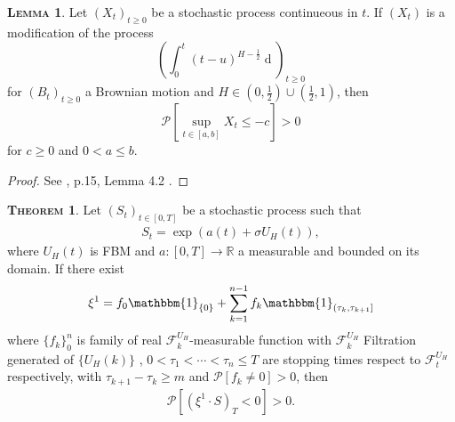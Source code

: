 \documentclass[a4paper, twoside, 11pt]{article}
\theoremstyle{definition}
\newtheorem{theorem}[definition]{\scshape Theorem}
\newtheorem{lemma}[definition]{\scshape Lemma}
\newcommand{\brkt}[1]{\left({#1} \right)}
\begin{document}
\begin{lemma}
  Let $(X_t)_{t\ge 0}$ be a stochastic process continueous in $t$. If $(X_t)$ is a modification of the process 
  $$
  \brkt{\int_0^t (t-u)^{H-\frac{1}{2}}\mathop{dB_u}}_{t\ge 0}
  $$
  for $(B_t)_{t\ge 0}$ a Brownian motion and $H\in (0, \frac{1}{2})\cup(\frac{1}{2}, 1)$,
  then 
  $$
  \mathcal{P}[\sup\limits_{t\in[a,b]} X_t \le -c] > 0
  $$
  for $c \ge 0$ and $0< a\le b$.
  \label{sec:lll} 
\end{lemma}

\begin{proof}
  See \cite{chridito}, p.15, Lemma 4.2 .
\end{proof}

\begin{theorem}
  Let $(S_t)_{t\in[0, T]}$ be a stochastic process such that
  \begin{eqnarray}
	S_t = \exp\brkt{a(t) + \sigma U_H(t)},
	\label{sec:fbs}
  \end{eqnarray}
  where $U_H(t)$ is FBM and $a: [0, T]\rightarrow \mathbb{R}$ a measurable and bounded on its domain. If there exist
  \begin{eqnarray*}
  \xi^1 = f_0\mathbbm{1}_{\{0\}}+\sum_{k=1}^{n-1} f_k \mathbbm{1}_{(\tau_k, \tau_{k+1}]}
  \end{eqnarray*}
  where $\{f_k\}_0^n$ is family of real $\mathcal{F}^{U_H}_k $-measurable function with $\mathcal{F}^{U_H}_k $ Filtration generated of $\{U_H(k)\}$ , $0 < \tau_1 < \cdots <\tau_n \le T$ are stopping times respect to $\mathcal{F}^{U_H}_t $ respectively,  with $\tau_{k+1} - \tau_k\ge m$ and $\mathcal{P}[f_k\neq 0]>0$, then
  \begin{eqnarray*}
	\mathcal{P}[(\xi^1 \cdot S)_T < 0] > 0.
	\label{sec:claim}
  \end{eqnarray*}
\end{theorem}
\end{document}
